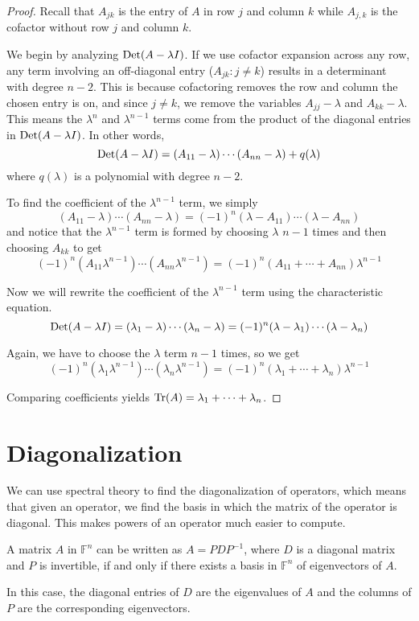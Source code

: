 \begin{proof}
Recall that $A_{jk}$ is the entry of $A$ in row $j$ and column $k$ while $A_{j, k}$ is the cofactor without row $j$ and column $k$. 

We begin by analyzing $\operatorname{Det}(A - \lambda I)$. If we use cofactor expansion across any row, any term involving an off-diagonal entry ($A_{jk} : j \neq k$) results in a determinant with degree $n - 2$. This is because cofactoring removes the row and column the chosen entry is on, and since $j \neq k$, we remove the variables $A_{jj} - \lambda$ and $A_{kk} - \lambda$. This means the $\lambda^{n}$ and $\lambda^{n-1}$ terms come from the product of the diagonal entries in $\operatorname{Det}(A - \lambda I)$. In other  words, 
$$\operatorname{Det}(A - \lambda I) = (A_{11} - \lambda) \cdots (A_{nn} - \lambda) + q(\lambda)$$
where $q(\lambda)$ is a polynomial with degree $n - 2$. 

To find the coefficient of the $\lambda^{n-1}$ term, we simply 
$$ (A_{11} - \lambda) \cdots (A_{nn} - \lambda) = (-1)^{n} (\lambda - A_{11}) \cdots (\lambda - A_{nn})$$
and notice that the $\lambda^{n-1}$ term is formed by choosing $\lambda$ $n - 1$ times and then choosing $A_{kk}$ to get 
$$ (-1)^{n} (A_{11} \lambda^{n-1}) \cdots (A_{nn} \lambda^{n-1}) = (-1)^{n} (A_{11} + \cdots + A_{nn}) \lambda^{n-1}$$

Now we will rewrite the coefficient of the $\lambda^{n-1}$ term using the characteristic equation. 
$$\operatorname{Det}(A - \lambda I) = (\lambda_{1} - \lambda) \cdots (\lambda_{n} - \lambda) = (-1)^{n} (\lambda - \lambda_{1}) \cdots (\lambda - \lambda_{n})$$

Again, we have to choose the $\lambda$ term $n - 1$ times, so we get 
$$(-1)^{n} (\lambda_{1} \lambda^{n-1}) \cdots (\lambda_{n} \lambda^{n-1}) = (-1)^{n} (\lambda_{1} + \cdots + \lambda_{n})\lambda^{n-1}$$

Comparing coefficients yields $\Trace(A) = \lambda_{1} + \cdots + \lambda_{n}$. 
\end{proof}

\section{Diagonalization}
We can use spectral theory to find the diagonalization of operators, which means that given an operator, we find the basis in which the matrix of the operator is diagonal. This makes powers of an operator much easier to compute. 

\begin{theorem}
A matrix $A$ in $\mathbb{F}^{n}$ can be written as $A = PDP^{-1}$, where $D$ is a diagonal matrix and $P$ is invertible, if and only if there exists a basis in $\mathbb{F}^{n}$ of eigenvectors of $A$. 

In this case, the diagonal entries of $D$ are the eigenvalues of $A$ and the columns of $P$ are the corresponding eigenvectors. 
\end{theorem}


